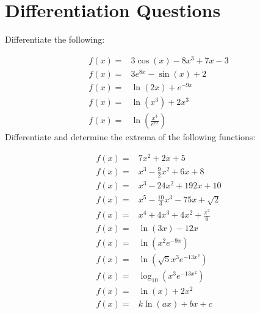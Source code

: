 \documentclass[main.tex]{subfiles}
\begin{document}
\section{Differentiation Questions}
Differentiate the following:

\begin{align}
f(x) =& 3 \cos(x)-8x^3+7x-3\\
f(x) =& 3e^{8x}-\sin(x)+2\\
f(x) =& \ln(2x) + e^{-9x}\\
f(x) =& \ln(x^3)+2x^3\\
f(x) =& \ln\left(\frac{x^3}{e^{7x}}\right)
\end{align}
Differentiate and determine the extrema of the following functions:

\begin{align}
f(x) =& 7x^2+2x+5\\
f(x) =& x^3-\frac{9}{2}x^2+6x+8\\
f(x) =& x^3-24x^2+192x+10\\
f(x) =& x^5-\frac{10}{3}x^3-75x+\sqrt{2}\\
f(x) =& x^4+4x^3+4x^2+\frac{\pi^2}{6}\\
f(x) =& \ln(3x)-12x\\
f(x) =& \ln(x^2e^{-9x})\\
f(x) =& \ln(\sqrt{5}x^3e^{-13x^2})\\
f(x) =& \log_{10}(x^3e^{-13x^2})\\
f(x) =& \ln(x) + 2x^2\\
f(x) =& k\ln(ax) + bx+c
\end{align}
\end{document}
